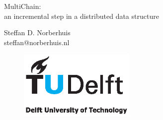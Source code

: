 \begin{titlepage}

\null\vfill

\begin{center}
\LARGE{MultiChain:\\
       		an incremental step in a distributed data structure}
\end{center}

\vspace{1.5cm}

\begin{center}
Steffan D. Norberhuis\\
steffan@norberhuis.nl
\end{center}

\vfill

\begin{figure}[!b]
\centering
\includegraphics[width={0.5\textwidth}]{pics/TUD_logo_color.eps}
\end{figure}

\vspace{2.0cm}

\end{titlepage}

